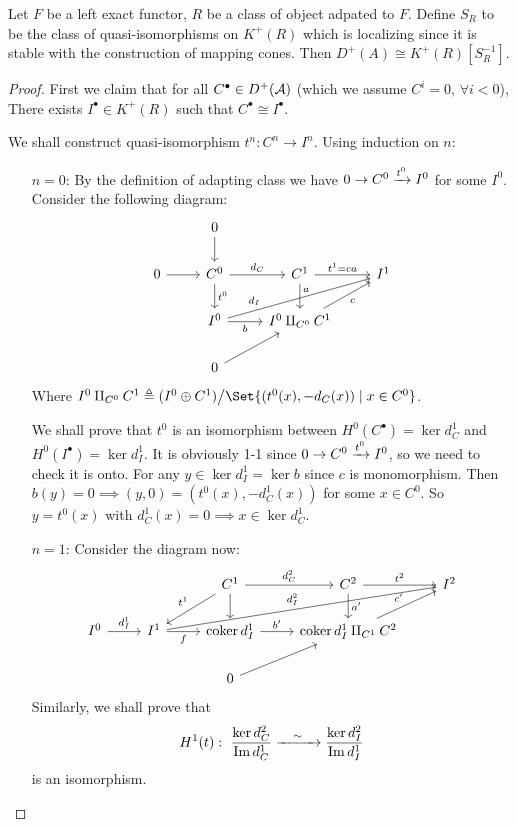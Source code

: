 \begin{theorem}
  Let $F$ be a left exact functor, $R$ be a class of object adpated to $F$.
  Define $S_R$ to be the class of quasi-isomorphisms on $K^+(R)$
  which is localizing since it is stable with the construction
  of mapping cones. Then $D^+(A) \cong K^+(R)[S_R^{-1}]$.

  \begin{proof}
    First we claim that for all $C^\bullet \in D^+(\mathcal{A})$ (which
    we assume $C^i = 0, \, \forall i < 0$),
    There exists $I^\bullet \in K^+(R)$ such that $C^\bullet \cong I^\bullet$.

    We shall construct quasi-isomorphism $t^n : C^n \to I^n$.
    Using induction on $n$:
    \begin{enumerate}
      \item[$n = 0$:] By the definition of adapting class we have
        $0 \to C^0 \xrightarrow{t^0} I^0$ for some $I^0$.
        Consider the following diagram:
        \[ \begin{tikzcd}
            & 0 \ar[d] & & \\
            0 \ar[r] & C^0 \ar[r, "d_C"] \ar[d, "t^0"] &
            C^1 \ar[r, "t^1 = c a"] \ar[d, "a", near start] & I^1 \\
            & I^0 \ar[r, "b"'] \ar[rru, "d_I", near start] &
            I^0 \amalg_{C^0} C^1 \ar[ru, "c"'] & \\
            & 0 \ar[ru] & &
        \end{tikzcd} \]
      Where $I^0 \amalg_{C^0} C^1 \triangleq (I^0 \oplus C^1)
      \big/ \Set{(t^0(x), -d_C(x)) \mid x \in C^0}$.

      We shall prove that $t^0$ is an isomorphism
      between $H^0(C^\bullet) = \ker d^1_C$ and
      $H^0(I^\bullet) = \ker d^1_I$. It is
      obviously 1-1 since $0 \to C^0 \xrightarrow{t^0} I^0$,
      so we need to check it is onto. For any $y \in \ker d^1_I
      = \ker b$ since $c$ is monomorphism.
      Then $b(y) = 0 \implies (y, 0) = (t^0(x), -d^1_C(x))$
      for some $x \in C^0$. So $y = t^0(x)$
      with $d^1_C(x) = 0 \implies x \in \ker d^1_C$.

    \item [$n = 1$:] Consider the diagram now:
        \[ \begin{tikzcd}
            & & C^1 \ar[r, "d^2_C"] \ar[d] \ar[ld, "t^1"'] &
            C^2 \ar[r, "t^2"] \ar[d, "a'"] & I^2 \\
            I^0 \ar[r, "d_I^1"] &
            I^1 \ar[r, "f"'] \ar[rrru, "d_I^2"] &
            \coker d^1_I \ar[r, "b'"] &
            \coker d^1_I \amalg_{C^1} C^2 \ar[ru, "c'"] \\
            & & 0 \ar[ru] & &
        \end{tikzcd} \]
      Similarly, we shall prove that
      \[ H^1(t) : \ \frac{\ker d^2_C}{\operatorname{Im} d^1_C}
        \xrightarrow{\quad\sim\quad} \frac{\ker d^2_I}{\operatorname{Im} d^1_I} \]
      is an isomorphism.


\end{enumerate}
\end{proof}
\end{theorem}
